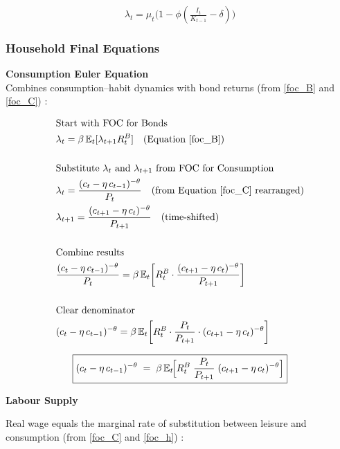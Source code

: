 \documentclass[11pt,preprint]{elsarticle}
\numberwithin{equation}{section}
\numberwithin{figure}{section}
\numberwithin{table}{section}
\begin{document}
\begin{equation}\label{foc_I}
\boxed{\lambda_t = \mu_t\bigl(1 - \phi(\tfrac{I_t}{K_{t-1}} - \delta)\bigr)}
\end{equation}

\subsubsection{Household Final
Equations}\label{household-final-equations}

\textbf{Consumption Euler Equation}\\
Combines consumption--habit dynamics with bond returns (from
\eqref{foc_B} and \eqref{foc_C}) :

\begin{align*}
& \text{Start with FOC for Bonds} \\
& \lambda_t = \beta\,\mathbb{E}_t[\lambda_{t+1}R_t^B] \quad \text{(Equation \ref{foc_B})} \\
& \\
& \text{Substitute } \lambda_t \text{ and } \lambda_{t+1} \text{ from FOC for Consumption} \\
& \lambda_t = \frac{(c_t - \eta\,c_{t-1})^{-\theta}}{P_t} \quad \text{(from Equation \ref{foc_C} rearranged)} \\
& \lambda_{t+1} = \frac{(c_{t+1} - \eta\,c_t)^{-\theta}}{P_{t+1}} \quad \text{(time-shifted)} \\
& \\
& \text{Combine results} \\
& \frac{(c_t - \eta\,c_{t-1})^{-\theta}}{P_t} = \beta\,\mathbb{E}_t\!\left[ R_t^B \cdot \frac{(c_{t+1} - \eta\,c_t)^{-\theta}}{P_{t+1}} \right] \\
& \\
& \text{Clear denominator} \\
& (c_t - \eta\,c_{t-1})^{-\theta} = \beta\,\mathbb{E}_t\!\left[ R_t^B \cdot \frac{P_t}{P_{t+1}} \cdot (c_{t+1} - \eta\,c_t)^{-\theta} \right]
\end{align*}

\begin{equation}\label{consEuler_app}
\boxed{%
  (c_t - \eta\,c_{t-1})^{-\theta}
  \;=\;
  \beta\,\mathbb{E}_t\!\Bigl[
    R_t^B \;\frac{P_t}{P_{t+1}}\;(c_{t+1} - \eta\,c_t)^{-\theta}
  \Bigr]
}
\end{equation}

\textbf{Labour Supply}

Real wage equals the marginal rate of substitution between leisure and
consumption (from \eqref{foc_C} and \eqref{foc_h}) :
\end{document}
